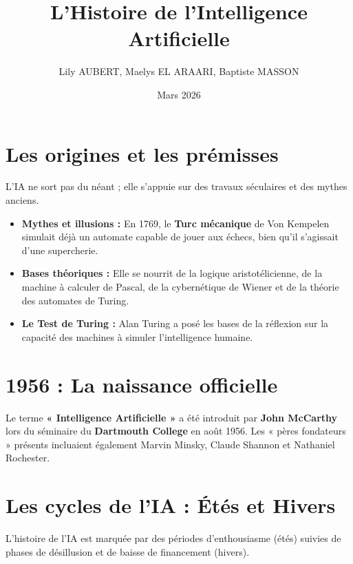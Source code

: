 \documentclass[12pt,a4paper]{article}
\title{L'Histoire de l'Intelligence Artificielle}
\author{Lily AUBERT, Maelys EL ARAARI, Baptiste MASSON}
\date{Mars 2026}
\begin{document}
\maketitle

\section{Les origines et les prémisses}

L'IA ne sort pas du néant ; elle s'appuie sur des travaux séculaires et des mythes anciens. 

\begin{itemize}
    \item \textbf{Mythes et illusions :} En 1769, le \textbf{Turc mécanique} de Von Kempelen simulait déjà un automate capable de jouer aux échecs, bien qu'il s'agissait d'une supercherie.
    \item \textbf{Bases théoriques :} Elle se nourrit de la logique aristotélicienne, de la machine à calculer de Pascal, de la cybernétique de Wiener et de la théorie des automates de Turing.
    \item \textbf{Le Test de Turing :} Alan Turing a posé les bases de la réflexion sur la capacité des machines à simuler l'intelligence humaine.
\end{itemize}

\section{1956 : La naissance officielle}

Le terme \textbf{« Intelligence Artificielle »} a été introduit par \textbf{John McCarthy} lors du séminaire du \textbf{Dartmouth College} en août 1956. Les « pères fondateurs » présents incluaient également Marvin Minsky, Claude Shannon et Nathaniel Rochester.

\section{Les cycles de l'IA : Étés et Hivers}

L'histoire de l'IA est marquée par des périodes d'enthousiasme (étés) suivies de phases de désillusion et de baisse de financement (hivers).
\end{document}
